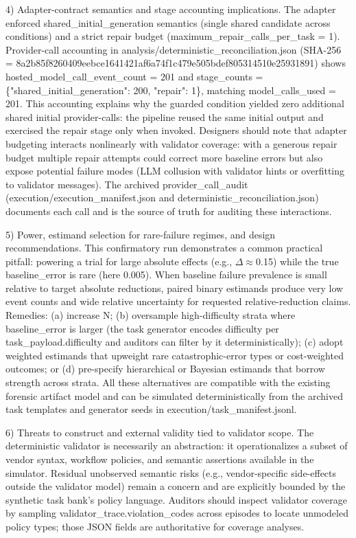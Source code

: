 \documentclass[conference]{IEEEtran}
\begin{document}
4) Adapter-contract semantics and stage accounting implications. The adapter enforced shared\_initial\_generation semantics (single shared candidate across conditions) and a strict repair budget (maximum\_repair\_calls\_per\_task = 1). Provider-call accounting in analysis/deterministic\_reconciliation.json (SHA-256 = 8a2b85f8260409eebce1641421af6a74f1c479e505bdef805314510e25931891) shows hosted\_model\_call\_event\_count = 201 and stage\_counts = \{"shared\_initial\_generation": 200, "repair": 1\}, matching model\_calls\_used = 201. This accounting explains why the guarded condition yielded zero additional shared initial provider-calls: the pipeline reused the same initial output and exercised the repair stage only when invoked. Designers should note that adapter budgeting interacts nonlinearly with validator coverage: with a generous repair budget multiple repair attempts could correct more baseline errors but also expose potential failure modes (LLM collusion with validator hints or overfitting to validator messages). The archived provider\_call\_audit (execution/execution\_manifest.json and deterministic\_reconciliation.json) documents each call and is the source of truth for auditing these interactions.

5) Power, estimand selection for rare-failure regimes, and design recommendations. This confirmatory run demonstrates a common practical pitfall: powering a trial for large absolute effects (e.g., \ensuremath{\Delta}\ensuremath{\approx}0.15) while the true baseline\_error is rare (here 0.005). When baseline failure prevalence is small relative to target absolute reductions, paired binary estimands produce very low event counts and wide relative uncertainty for requested relative-reduction claims. Remedies: (a) increase N; (b) oversample high-difficulty strata where baseline\_error is larger (the task generator encodes difficulty per task\_payload.difficulty and auditors can filter by it deterministically); (c) adopt weighted estimands that upweight rare catastrophic-error types or cost-weighted outcomes; or (d) pre-specify hierarchical or Bayesian estimands that borrow strength across strata. All these alternatives are compatible with the existing forensic artifact model and can be simulated deterministically from the archived task templates and generator seeds in execution/task\_manifest.jsonl.

6) Threats to construct and external validity tied to validator scope. The deterministic validator is necessarily an abstraction: it operationalizes a subset of vendor syntax, workflow policies, and semantic assertions available in the simulator. Residual unobserved semantic risks (e.g., vendor‑specific side-effects outside the validator model) remain a concern and are explicitly bounded by the synthetic task bank's policy language. Auditors should inspect validator coverage by sampling validator\_trace.violation\_codes across episodes to locate unmodeled policy types; those JSON fields are authoritative for coverage analyses.
\end{document}
